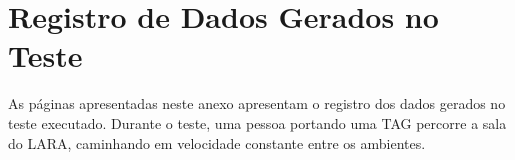
\chapter{Registro de Dados Gerados no Teste} \label{anex:testlog}

As páginas apresentadas neste anexo apresentam o registro dos dados gerados no teste executado. Durante o teste, uma pessoa portando uma TAG percorre a sala do LARA, caminhando em velocidade constante entre os ambientes.
